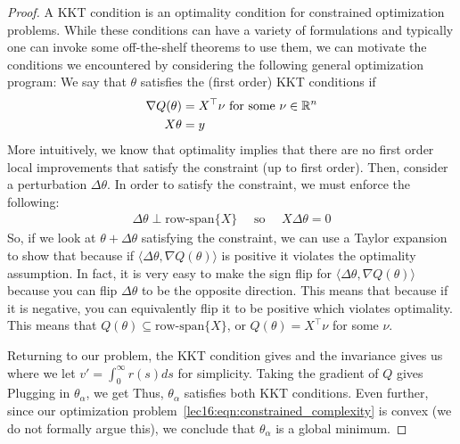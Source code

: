 \begin{proof}
A KKT condition is an optimality condition for constrained optimization problems. While these conditions can have a variety of formulations and typically one can invoke some off-the-shelf theorems to use them, we can motivate the conditions we encountered by considering the following general optimization program:
We say that \(\theta\) satisfies the (first order) KKT conditions if
\begin{align}
    \nabla Q(\theta) &= X^\top \nu \text{ for some } \nu \in \mathbb R^n \\
    X\theta &=y
\end{align}
More intuitively, we know that optimality implies that there are no first order local improvements that satisfy the constraint (up to first order). Then, consider a perturbation \(\Delta \theta\). In order to satisfy the constraint, we must enforce the following:
\begin{align}
\Delta \theta \perp \text{row-span}\{X\}  \quad \text{ so } \quad X \Delta \theta = 0
\end{align}
So, if we look at \(\theta + \Delta \theta \) satisfying the constraint, we can use a Taylor expansion to show that
because if \( \langle \Delta \theta, \nabla Q(\theta) \rangle\) is positive it violates the optimality assumption.
In fact, it is very easy to make the sign flip for \( \langle \Delta \theta, \nabla Q(\theta) \rangle\) because you can flip \(\Delta \theta\) to be the opposite direction. This means that
because if it is negative, you can equivalently flip it to be positive which violates optimality.
This means that \(Q(\theta) \subseteq \text{row-span}\{X\}\), or \(Q(\theta) = X^\top \nu\) for some $\nu$.

Returning to our problem, the KKT condition gives
and the invariance gives us
where we let \(v' = \int_0^\infty r(s) ds\) for simplicity.
Taking the gradient of \(Q\) gives
Plugging in \(\theta_\alpha\), we get
Thus, \(\theta_\alpha\) satisfies both KKT conditions. Even further, since our optimization problem~\eqref{lec16:eqn:constrained_complexity} is convex (we do not formally argue this), we conclude that \(\theta_\alpha\) is a global minimum.
\end{proof}

